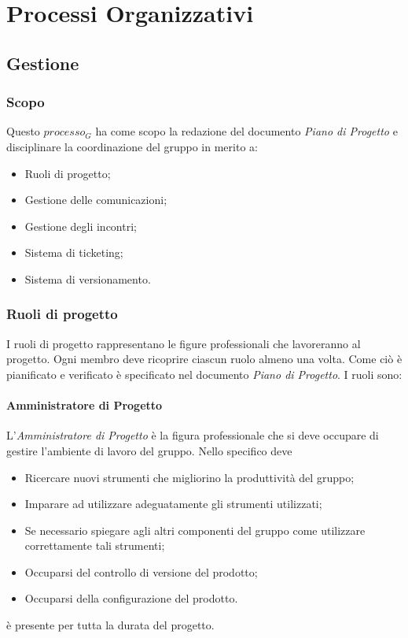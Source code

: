 \section{Processi Organizzativi}


\subsection{Gestione}

	\subsubsection{Scopo}
	Questo $processo_G$ ha come scopo la redazione del documento \emph{Piano di Progetto} e disciplinare la coordinazione del gruppo in merito a:
	\begin{itemize}
		\item Ruoli di progetto;
		\item Gestione delle comunicazioni;
		\item Gestione degli incontri;
		\item Sistema di ticketing;
		\item Sistema di versionamento.
		
	\end{itemize}
	\subsubsection{Ruoli di progetto} 
	I ruoli di progetto rappresentano le figure professionali che lavoreranno al progetto.  Ogni membro deve ricoprire ciascun ruolo almeno una volta. Come ciò è pianificato e verificato è specificato nel documento \emph{Piano di Progetto}. I ruoli sono:
		\paragraph{Amministratore di Progetto} \Spazio
		L'\emph{Amministratore di Progetto} è la figura professionale che si deve occupare di gestire l'ambiente di lavoro del gruppo. Nello specifico deve
		\begin{itemize}
			\item Ricercare nuovi strumenti che migliorino la produttività del gruppo;
			\item Imparare ad utilizzare adeguatamente gli strumenti utilizzati;
			\item Se necessario spiegare agli altri componenti del gruppo come utilizzare correttamente tali strumenti;
			\item Occuparsi del controllo di versione del prodotto;
			\item Occuparsi della configurazione del prodotto.
		\end{itemize}
		è presente per tutta la durata del progetto.
